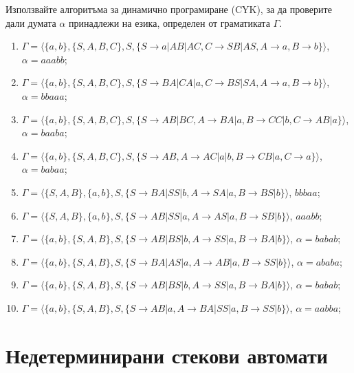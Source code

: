 \begin{problem}
Използвайте алгоритъма за динамично програмиране (CYK), за да проверите дали
думата $\alpha$ принадлежи на езика, определен от граматиката $\Gamma$.

\begin{enumerate}
\item
$\Gamma=\langle \{a,b\}, \{S,A,B,C\},S,\{S\rightarrow a| AB|AC, C\rightarrow SB|AS,A\rightarrow a, B\rightarrow b\}\rangle$, $\alpha=aaabb$;
\item
$\Gamma=\langle \{a,b\}, \{S,A,B,C\},S,\{S\rightarrow BA| CA|a, C\rightarrow BS|SA,A\rightarrow a, B\rightarrow b\}\rangle$, $\alpha=bbaaa$;
\item
$\Gamma=\langle \{a,b\}, \{S,A,B,C\},S,\{S\rightarrow AB|BC, A\rightarrow BA|a,B\rightarrow CC|b, C\rightarrow AB|a\}\rangle$, $\alpha=baaba$;
\item
$\Gamma=\langle \{a,b\}, \{S,A,B,C\},S,\{S\rightarrow AB, A\rightarrow AC|a|b,B\rightarrow CB|a, C\rightarrow a\}\rangle$, $\alpha=babaa$;
\item
$\Gamma=\langle \{S,A,B\}, \{a,b\},S,\{S\rightarrow BA|SS|b, A\rightarrow SA|a,B\rightarrow BS|b\}\rangle$, $bbbaa$;
\item
$\Gamma=\langle\{S,A,B\},\{a,b\},S,\{S\rightarrow AB|SS|a, A\rightarrow AS|a,B\rightarrow SB|b\}\rangle$, $aaabb$;
\item
$\Gamma=\langle \{a,b\}, \{S,A,B\},S,\{S\rightarrow AB| BS|b, A\rightarrow SS|a,B\rightarrow BA|b\}\rangle$, $\alpha=babab$;
\item
$\Gamma=\langle \{a,b\}, \{S,A,B\},S,\{S\rightarrow BA| AS|a, A\rightarrow AB|a,B\rightarrow SS|b\}\rangle$, $\alpha=ababa$;
\item
$\Gamma=\langle \{a,b\}, \{S,A,B\},S,\{S\rightarrow AB| BS|b, A\rightarrow SS|a,B\rightarrow BA|b\}\rangle$, $\alpha=babab$;
\item
$\Gamma=\langle \{a,b\}, \{S,A,B\},S,\{S\rightarrow AB|a, A\rightarrow BA|SS|a,B\rightarrow SS|b\}\rangle$, $\alpha=aabba$;
\end{enumerate}
\end{problem}


\section{Недетерминирани стекови автомати}

